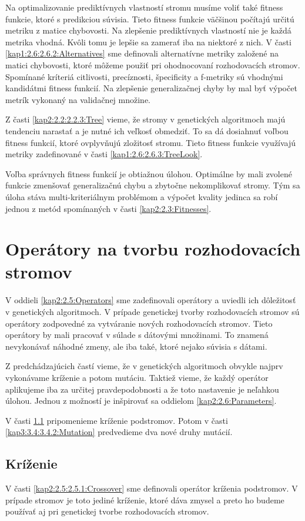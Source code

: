 Na optimalizovanie prediktívnych vlastností stromu musíme voliť také fitness funkcie, ktoré s predikciou súvisia. Tieto fitness funkcie väčšinou počítajú určitú metriku z matice chybovosti. Na zlepšenie prediktívnych vlastností nie je každá metrika vhodná. Kvôli tomu je lepšie sa zamerať iba na niektoré z nich.
V časti \ref{kap1:2.6:2.6.2:Alternatives} sme definovali alternatívne metriky založené na matici chybovosti, ktoré môžeme použiť pri ohodnocovaní rozhodovacích stromov. Spomínané kríteriá citlivosti, precíznosti, špecificity a f-metriky sú vhodnými kandidátmi fitness funkcií. Na zlepšenie generalizačnej chyby by mal byť výpočet metrík vykonaný na validačnej množine.

Z časti \ref{kap2:2.2:2.2.3:Tree} vieme, že stromy v genetických algoritmoch majú tendenciu narastať a je nutné ich veľkosť obmedziť. To sa dá dosiahnuť voľbou fitness funkcií, ktoré ovplyvňujú zložitosť stromu. Tieto fitness funkcie využívajú metriky zadefinované v časti \ref{kap1:2.6:2.6.3:TreeLook}.

Voľba správnych fitness funkcií je obtiažnou úlohou. Optimálne by mali zvolené funkcie zmenšovať generalizačnú chybu a zbytočne nekomplikovať stromy. Tým sa úloha stáva multi-kriteriálnym problémom a výpočet kvality jedinca sa robí jednou z metód spomínaných v časti \ref{kap2:2.3:Fitnesses}.
\section{Operátory na tvorbu rozhodovacích stromov}\label{kap3:3.4:Operators}
V oddieli \ref{kap2:2.5:Operators} sme zadefinovali operátory a uviedli ich dôležitosť v genetických algoritmoch. V prípade genetickej tvorby rozhodovacích stromov sú operátory zodpovedné za vytváranie nových rozhodovacích stromov. Tieto operátory by mali pracovať v súlade s dátovými množinami. To znamená nevykonávať náhodné zmeny, ale iba také, ktoré nejako súvisia s dátami.

Z predchádzajúcich častí vieme, že v genetických algoritmoch obvykle najprv vykonávame kríženie a potom mutáciu. Taktiež vieme, že každý operátor aplikujeme iba za určitej pravdepodobnosti a že toto nastavenie je neľahkou úlohou. Jednou z možností je inšpirovať sa oddielom \ref{kap2:2.6:Parameters}.

V časti \ref{kap3:3.4:3.4.1:Crossover} pripomenieme kríženie podstromov. Potom v časti \ref{kap3:3.4:3.4.2:Mutation} predvedieme dva nové druhy mutácií.

\subsection{Kríženie}\label{kap3:3.4:3.4.1:Crossover}
V časti \ref{kap2:2.5:2.5.1:Crossover} sme definovali operátor kríženia podstromov. V prípade stromov je toto jediné kríženie, ktoré dáva zmysel a preto ho budeme používať aj pri genetickej tvorbe rozhodovacích stromov. 

